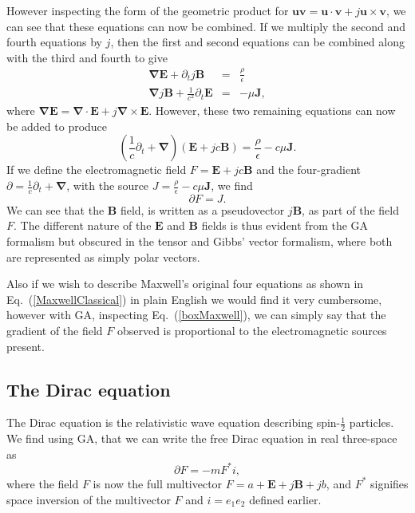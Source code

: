 \documentclass[prb,preprint]{revtex4}
\newcommand{\be}{\begin{equation}}
\newcommand{\ee}{\end{equation}}
\newcommand{\bea}{\begin{eqnarray}}
\newcommand{\eea}{\end{eqnarray}}
\newcommand{\iGA}{{j}}
\newcommand{\iGAT}{{i}}
\begin{document}
However inspecting the form of the geometric product for $ \boldsymbol{u} \boldsymbol{v} = \boldsymbol{u} \cdot \boldsymbol{v}  + \iGA \boldsymbol{u} \times \boldsymbol{v} $, we can see that these equations can now be combined. If we multiply the second and fourth equations by  $ \iGA $, then the first and second equations can be combined along with the third and fourth to give
\bea \label{MaxwellClassicalWithiTwoEqn}
\boldsymbol{\nabla} \boldsymbol{E} +  \partial_t \iGA \boldsymbol{B} & = & \frac{\rho}{\epsilon}  \\ \nonumber
\boldsymbol{\nabla} \iGA \boldsymbol{B} +  \frac{1}{c^2} \partial_t \boldsymbol{E} & = & -\mu \boldsymbol{J},  \nonumber
\eea
where $ \boldsymbol{\nabla} \boldsymbol{E} = \boldsymbol{\nabla} \cdot \boldsymbol{E} + \iGA \boldsymbol{\nabla} \times \boldsymbol{E} $.
However, these two remaining equations can now be added to produce
\be \label{MaxwellClassicalWithiOneEqn}
\left (\frac{1}{c} \partial_t + \boldsymbol{\nabla} \right ) (  \boldsymbol{E} +  \iGA c \boldsymbol{B} ) =  \frac{\rho}{\epsilon} -c \mu \boldsymbol{J}.
\ee
If we define the electromagnetic field $ F = \boldsymbol{E} +  \iGA c \boldsymbol{B} $ and the four-gradient $ \partial = \frac{1}{c} \partial_t + \boldsymbol{\nabla} $, with the source $ J =  \frac{\rho}{\epsilon} -c \mu \boldsymbol{J} $, we find
\be \label{boxMaxwell}
\partial F = J.
\ee
We can see that the $ \boldsymbol{B} $ field, is written as a pseudovector $ \iGA \boldsymbol{B} $, as part of the field $ F $.  The different nature of the $ \boldsymbol{E} $ and $ \boldsymbol{B} $ fields is thus evident from the GA formalism but obscured in the tensor and Gibbs' vector formalism, where both are represented as simply polar vectors.

Also if we wish to describe Maxwell's original four equations as shown in Eq.~(\ref{MaxwellClassical}) in plain English we would find it very cumbersome, however with GA, inspecting Eq.~(\ref{boxMaxwell}), we can simply say that the gradient of the field $ F$ observed is proportional to the electromagnetic sources present.


\subsection{The Dirac equation}

The Dirac equation is the relativistic wave equation describing spin-$\frac{1}{2}$ particles.
We find using GA, that we can write the free Dirac equation in real three-space as
\be \label{freeDirac}
\partial F = - m F^{*} \iGAT ,
\ee
where the field $ F $ is now the full multivector $ F = a +\boldsymbol{E} + \iGA \boldsymbol{B} + \iGA b $, and $ F^{*} $ signifies space inversion of the multivector $ F $ and $ \iGAT =  e_1 e_2 $  defined earlier.
\end{document}
